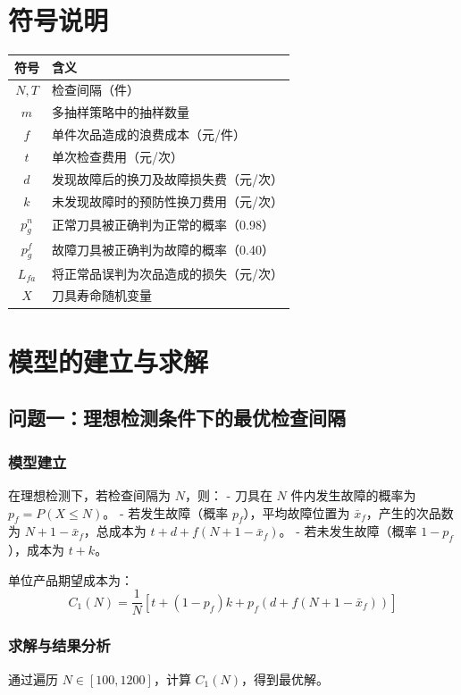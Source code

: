 \documentclass[12pt]{article}
\begin{document}
\section{符号说明}
\begin{table}[htbp]
\centering
\begin{tabular}{cl}
\toprule
符号 & 含义 \\
\midrule
$N, T$ & 检查间隔（件） \\
$m$ & 多抽样策略中的抽样数量 \\
$f$ & 单件次品造成的浪费成本（元/件） \\
$t$ & 单次检查费用（元/次） \\
$d$ & 发现故障后的换刀及故障损失费（元/次） \\
$k$ & 未发现故障时的预防性换刀费用（元/次） \\
$p_g^n$ & 正常刀具被正确判为正常的概率（0.98） \\
$p_g^f$ & 故障刀具被正确判为故障的概率（0.40） \\
$L_{fa}$ & 将正常品误判为次品造成的损失（元/次） \\
$X$ & 刀具寿命随机变量 \\
\bottomrule
\end{tabular}
\end{table}

\section{模型的建立与求解}
\subsection{问题一：理想检测条件下的最优检查间隔}
\subsubsection{模型建立}
在理想检测下，若检查间隔为 $N$，则：
- 刀具在 $N$ 件内发生故障的概率为 $p_f = P(X \leq N)$。
- 若发生故障（概率 $p_f$），平均故障位置为 $\bar{x}_f$，产生的次品数为 $N + 1 - \bar{x}_f$，总成本为 $t + d + f(N + 1 - \bar{x}_f)$。
- 若未发生故障（概率 $1-p_f$），成本为 $t + k$。

单位产品期望成本为：
\[
C_1(N) = \frac{1}{N} \left[ t + (1-p_f)k + p_f(d + f(N + 1 - \bar{x}_f)) \right]
\]

\subsubsection{求解与结果分析}
通过遍历 $N \in [100, 1200]$，计算 $C_1(N)$，得到最优解。
\end{document}

